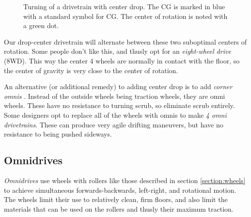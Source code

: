 \begin{figure}[H]
\begin{subfigure}[]{0.5\linewidth}
\end{subfigure}
\caption{Turning of a drivetrain with center drop. The CG is marked in blue with a standard symbol for CG. The center of rotation is noted with a green dot.}
\end{figure}

Our drop-center drivetrain will alternate between these two suboptimal centers of rotation. Some people don't like this, and thusly opt for an \textit{eight-wheel drive} (8WD). This way the center 4 wheels are normally in contact with the floor, so the center of gravity is very close to the center of rotation.

An alternative (or additional remedy) to adding center drop is to add \textit{corner omnis} . Instead of the outside wheels being traction wheels, they are omni wheels. These have no resistance to turning scrub, so eliminate scrub entirely. Some designers opt to replace all of the wheels with omnis to make \textit{4 omni drivetrains}. These can produce very agile drifting maneuvers, but have no resistance to being pushed sideways.

\subsection{Omnidrives}
\textit{Omnidrives} use wheels with rollers like those described in section \ref{section:wheels} to achieve simultaneous forwards-backwards, left-right, and rotational motion. The wheels limit their use to relatively clean, firm floors, and also limit the materials that can be used on the rollers and thusly their maximum traction.

